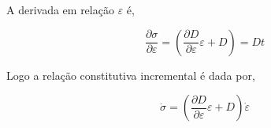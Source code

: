 \documentclass[12pt,a4paper]{article}
\begin{document}
\noindent
A derivada em relação $\varepsilon$ é,

\begin{equation}
\frac{\partial \sigma}{\partial \varepsilon} = \left(\frac{\partial D}{\partial \varepsilon} \varepsilon + D\right) = Dt
\end{equation}

\noindent
Logo a relação constitutiva incremental é dada por,

\begin{equation}
\dot {\sigma} = \left(\frac{\partial D}{\partial \varepsilon} \varepsilon + D\right) \dot{\varepsilon}
\end{equation}

\end{document}
